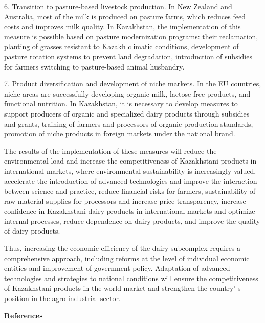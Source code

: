 \begin{multicols}{2}
6. Transition to pasture-based livestock production. In New Zealand and
Australia, most of the milk is produced on pasture farms, which
reduces feed costs and improves milk quality. In Kazakhstan, the
implementation of this measure is possible based on pasture
modernization programs: their reclamation, planting of grasses
resistant to Kazakh climatic conditions, development of pasture
rotation systems to prevent land degradation, introduction of
subsidies for farmers switching to pasture-based animal husbandry.

7. Product diversification and development of niche markets. In the EU
countries, niche areas are successfully developing organic milk,
lactose-free products, and functional nutrition. In Kazakhstan, it is
necessary to develop measures to support producers of organic and
specialized dairy products through subsidies and grants, training of
farmers and processors of organic production standards, promotion of
niche products in foreign markets under the national brand.

The results of the implementation of these measures will reduce the
environmental load and increase the competitiveness of Kazakhstani
products in international markets, where environmental sustainability is
increasingly valued, accelerate the introduction of advanced
technologies and improve the interaction between science and practice,
reduce financial risks for farmers, sustainability of raw material
supplies for processors and increase price transparency, increase
confidence in Kazakhstani dairy products in international markets and
optimize internal processes, reduce dependence on dairy products, and
improve the quality of dairy products.

Thus, increasing the economic efficiency of the dairy subcomplex
requires a comprehensive approach, including reforms at the level of
individual economic entities and improvement of government policy.
Adaptation of advanced technologies and strategies to national
conditions will ensure the competitiveness of Kazakhstani products in
the world market and strengthen the country' s position
in the agro-industrial sector.
\end{multicols}

\begin{center}
{\bfseries References}
\end{center}

